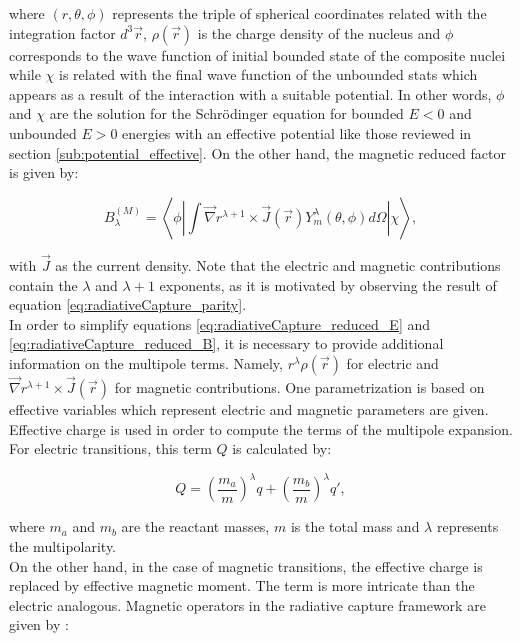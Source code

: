 \documentclass[openany]{book}
\begin{document}
where $(r, \theta, \phi)$ represents the triple of spherical coordinates related with the integration factor $d^3 \vec r $,  $\rho(\vec r)$ is the charge density of the nucleus and
$\phi$ corresponds to the wave function of initial bounded state of the composite nuclei while $\chi$ is related with the final wave function of the unbounded stats which appears as a result of the interaction with a suitable potential.  In other words, $\phi$ and $\chi$ are the solution for the Schrödinger equation for bounded $E < 0 $ and unbounded $E > 0$ energies with an effective potential like those reviewed in section \ref{sub:potential_effective}. On the other hand, the magnetic reduced factor is given by: 

\begin{equation} \label{eq:radiativeCapture_reduced_B}
	B^{(M)}_{\lambda} =  \left \langle  \phi  \left|  \int  \vec \nabla r^{\lambda+1} \times \vec J (\vec r) Y^{\lambda}_{m} (\theta, \phi) d \Omega \right|   \chi  \right \rangle ,  
\end{equation}

with $\vec J$ as the current density.  Note that the electric and magnetic contributions contain the $\lambda$ and $\lambda + 1$ exponents, as it is motivated by observing the result of equation \ref{eq:radiativeCapture_parity}. \\

In order to simplify equations \ref{eq:radiativeCapture_reduced_E} and 
\ref{eq:radiativeCapture_reduced_B}, it is necessary to provide additional information on the multipole terms. Namely, $  r^\lambda \rho(\vec r)$ for electric and $\vec \nabla r^{\lambda+1} \times \vec J (\vec r)$ for magnetic contributions. One parametrization is based on effective variables which represent electric and magnetic parameters are given. Effective charge is used in order to compute the terms of the multipole expansion. For electric transitions, this term $Q$ is calculated by:

\begin{equation} \label{eq:radiativeCapture_Electric_charge}
	Q =  \left(\frac{m_a}{m}\right)^{\lambda}q + \left(\frac{m_b}{m}\right)^{\lambda}q',
\end{equation}

where $m_a$ and $m_b$ are the reactant masses, $m$ is the total mass and $\lambda$ represents the multipolarity. \\

On the other hand, in the case of magnetic transitions, the effective charge is replaced by effective magnetic moment.
The term is more intricate than the electric analogous. Magnetic operators in the radiative capture framework are given by \cite{tursunov_turakulov_kadyrov_blokhintsev_2021}:
\end{document}
